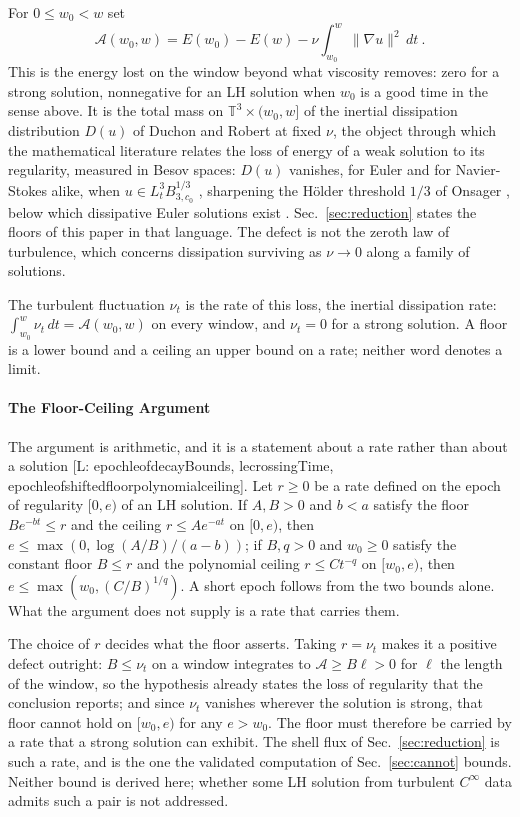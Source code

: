 \documentclass[letterpaper,twocolumn]{article}
\newcommand{\lean}[1]{{\footnotesize\def\_{\textunderscore\allowbreak}%
\hspace{0pt}[L: {\ttfamily\fontdimen3\font=2pt\fontdimen4\font=1pt #1}]}}
\newcommand{\T}{\mathbb{T}}
\newcommand{\A}{\mathcal{A}}
\begin{document}
For $0 \leq w_0 < w$ set
\begin{equation}
\label{eq:defect}
\A(w_0, w) = E(w_0) - E(w) - \nu \int_{w_0}^{w} \|\nabla u\|^2 \, dt \ .
\end{equation}
This is the energy lost on the window beyond what viscosity removes: zero
for a strong solution, nonnegative for an LH solution when $w_0$ is a
good time in the sense above. It is the total mass on $\T^3 \times
(w_0,w]$ of the inertial dissipation distribution $D(u)$ of Duchon and
Robert \cite{DucRob00} at fixed $\nu$, the object through which the
mathematical literature relates the loss of energy of a weak solution to
its regularity, measured in Besov spaces: $D(u)$ vanishes, for Euler and
for Navier-Stokes alike, when $u \in L^3_t B^{1/3}_{3,c_0}$
\cite{DucRob00,CheConFriShv08,CheFriShv10}, sharpening the H\"older
threshold $1/3$ of Onsager \cite{Ons49,Eyi94,ConETit94}, below which
dissipative Euler solutions exist \cite{Ise18,BucDeLSzeVic19}.
Sec.~\ref{sec:reduction} states the floors of this paper in that language.
The defect is not the
zeroth law of turbulence, which concerns dissipation surviving as $\nu
\to 0$ along a family of solutions.

The turbulent fluctuation $\nu_t$ is the rate of this loss, the inertial
dissipation rate: $\int_{w_0}^{w} \nu_t \, dt = \A(w_0,w)$ on every
window, and $\nu_t = 0$ for a strong solution. A floor is a lower bound
and a ceiling an upper bound on a rate; neither word denotes a limit.

\paragraph*{The Floor-Ceiling Argument}

The argument is arithmetic, and it is a statement about a rate rather
than about a solution \lean{epoch\_le\_of\_decayBounds,
le\_crossingTime, epoch\_le\_of\_shifted\_floor\_polynomial\_ceiling}.
Let $r \geq 0$ be a rate defined on the epoch of regularity $[0,e)$ of
an LH solution. If $A, B > 0$ and $b < a$ satisfy the floor $B e^{-bt}
\leq r$ and the ceiling $r \leq A e^{-at}$ on $[0,e)$, then $e \leq
\max(0, \log(A/B)/(a-b))$; if $B, q > 0$ and $w_0 \geq 0$ satisfy the
constant floor $B \leq r$ and the polynomial ceiling $r \leq C t^{-q}$
on $[w_0,e)$, then $e \leq \max(w_0, (C/B)^{1/q})$. A short epoch
follows from the two bounds alone. What the argument does not supply is
a rate that carries them.

The choice of $r$ decides what the floor asserts. Taking $r = \nu_t$
makes it a positive defect outright: $B \leq \nu_t$ on a window
integrates to $\A \geq B\ell > 0$ for $\ell$ the length of the window,
so the hypothesis already states the loss of regularity that the
conclusion reports; and since $\nu_t$ vanishes wherever the solution is
strong, that floor cannot hold on $[w_0,e)$ for any $e > w_0$. The floor
must therefore be carried by a rate that a strong solution can exhibit.
The shell flux of Sec.~\ref{sec:reduction} is such a rate, and is the
one the validated computation of Sec.~\ref{sec:cannot} bounds. Neither
bound is derived here; whether some LH solution from turbulent
$C^\infty$ data admits such a pair is not addressed.
\end{document}

